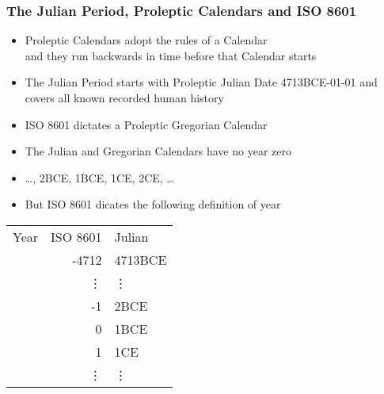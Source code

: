 \documentclass[11pt,pdftex,dvipsnames,usenames,helvetica]{beamer}
\begin{document}
\begin{frame} 
\frametitle{The Julian Period, Proleptic Calendars and ISO 8601}
\begin{itemize}
\item Proleptic Calendars adopt the rules of a Calendar\\
 and they run backwards in time before that Calendar starts
\item The Julian Period starts with Proleptic Julian Date 4713BCE-01-01
and covers all known recorded human history
\item ISO 8601 dictates a Proleptic Gregorian Calendar
\item The Julian and Gregorian Calendars have no year zero
\item \dots, 2BCE, 1BCE, 1CE, 2CE, \dots
\item But ISO 8601 dicates the following definition of year
\end{itemize}
\begin{tabular}{lrl}
Year & ISO 8601 & Julian \\
& -4712         & 4713BCE \\
& \vdots        & \vdots \\
& -1            & 2BCE \\
& 0             & 1BCE \\
& 1             & 1CE \\
& \vdots        & \vdots
\end{tabular}

\end{frame}
\end{document}
